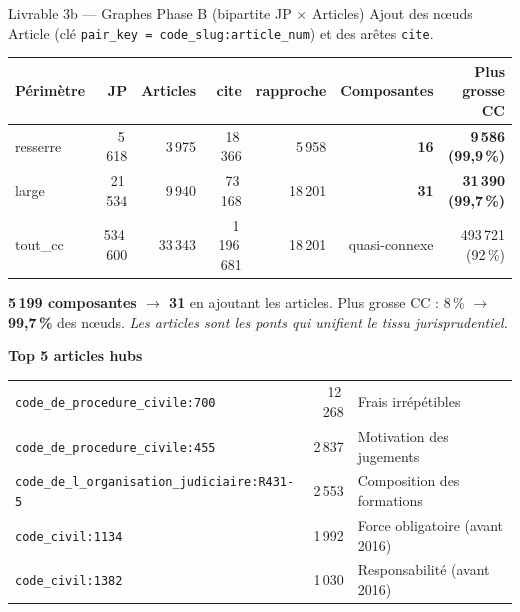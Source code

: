 \documentclass[aspectratio=169,10pt]{beamer}
\newcommand{\keybox}[1]{%
  \begin{center}
  \colorbox{accentsoft}{\parbox{0.92\linewidth}{\centering #1}}
  \end{center}}
\begin{document}
\begin{frame}{Livrable 3b --- Graphes Phase B (bipartite JP $\times$ Articles)}
  Ajout des n\oe uds Article (clé \texttt{pair\_key = code\_slug:article\_num}) et des arêtes \texttt{cite}.

  \footnotesize
  \begin{tabular}{@{}l r r r r r r@{}}
    \toprule
    \textbf{Périmètre} & \textbf{JP} & \textbf{Articles} & \textbf{cite} & \textbf{rapproche} & \textbf{Composantes} & \textbf{Plus grosse CC} \\
    \midrule
    resserre & 5\,618   & 3\,975  & 18\,366    & 5\,958  & \textbf{16}   & \textbf{9\,586 (99{,}9\,\%)} \\
    large    & 21\,534  & 9\,940  & 73\,168    & 18\,201 & \textbf{31}   & \textbf{31\,390 (99{,}7\,\%)} \\
    tout\_cc & 534\,600 & 33\,343 & 1\,196\,681& 18\,201 & quasi-connexe & 493\,721 (92\,\%) \\
    \bottomrule
  \end{tabular}

  \vspace{0.5em}
  \keybox{\small \textbf{5\,199 composantes $\to$ 31} en ajoutant les articles.
  Plus grosse CC : 8\,\% $\to$ \textbf{99{,}7\,\%} des n\oe uds.
  \textit{Les articles sont les ponts qui unifient le tissu jurisprudentiel.}}

  \vspace{0.3em}
  \textbf{Top 5 articles hubs}

  \scriptsize
  \begin{tabular}{@{}l r l@{}}
    \toprule
    \texttt{code\_de\_procedure\_civile:700}              & 12\,268 & Frais irrépétibles \\
    \texttt{code\_de\_procedure\_civile:455}              & 2\,837  & Motivation des jugements \\
    \texttt{code\_de\_l\_organisation\_judiciaire:R431-5} & 2\,553  & Composition des formations \\
    \texttt{code\_civil:1134}                             & 1\,992  & Force obligatoire (avant 2016) \\
    \texttt{code\_civil:1382}                             & 1\,030  & Responsabilité (avant 2016) \\
    \bottomrule
  \end{tabular}
\end{frame}
\end{document}
